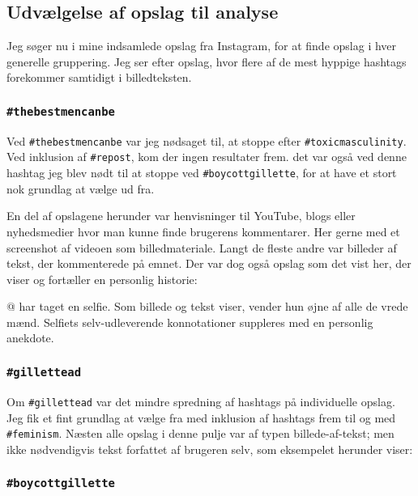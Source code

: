 \subsection{Udvælgelse af opslag til analyse}

Jeg søger nu i mine indsamlede opslag fra Instagram, for at finde 
opslag i hver generelle gruppering. Jeg ser efter opslag, hvor 
flere af de mest hyppige hashtags forekommer samtidigt i
billedteksten.

\subsubsection{\texttt{\#thebestmencanbe}}

Ved \texttt{\#thebestmencanbe} var jeg nødsaget til, at stoppe 
efter \texttt{\#toxicmasculinity}. Ved inklusion af 
\texttt{\#repost}, kom der ingen resultater frem.  det var også 
ved denne hashtag jeg blev nødt til at stoppe ved 
\texttt{\#boycottgillette}, for at have et stort nok grundlag at 
vælge ud fra. 

En del af opslagene herunder var henvisninger til YouTube, blogs 
eller nyhedsmedier hvor man kunne finde brugerens kommentarer.  
Her gerne med et screenshot af videoen som billedmateriale. Langt 
de fleste andre var billeder af tekst, der kommenterede på emnet.  
Der var dog også opslag som det vist her, der viser og fortæller 
en personlig historie:



@\citeauthor{rebelliousredhead2019} har taget en selfie. Som 
billede og tekst viser, vender hun øjne af alle de vrede mænd.  
Selfiets selv-udleverende konnotationer suppleres med en personlig 
anekdote.

\subsubsection{\texttt{\#gillettead}}

Om \texttt{\#gillettead} var det mindre spredning af hashtags på 
individuelle opslag. Jeg fik et fint grundlag at vælge fra med 
inklusion af hashtags frem til og med \texttt{\#feminism}. Næsten 
alle opslag i denne pulje var af typen billede-af-tekst; men ikke 
nødvendigvis tekst forfattet af brugeren selv, som eksempelet 
herunder viser:



\subsubsection{\texttt{\#boycottgillette}}


